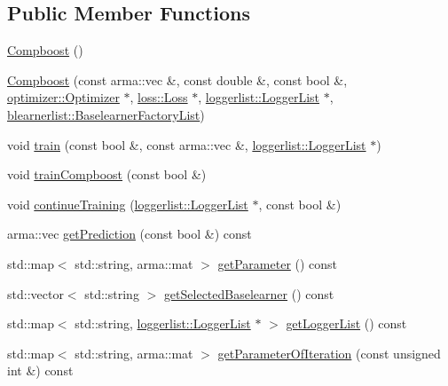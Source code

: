 \subsection*{Public Member Functions}
\begin{DoxyCompactItemize}
\item 
\hyperlink{classcboost_1_1_compboost_a5117b7b8cf0a424e736f6833bc5c3a68}{Compboost} ()
\item 
\hyperlink{classcboost_1_1_compboost_a24b98d64e9aac2a7a8ec4e64a49a1f7c}{Compboost} (const arma\+::vec \&, const double \&, const bool \&, \hyperlink{classoptimizer_1_1_optimizer}{optimizer\+::\+Optimizer} $\ast$, \hyperlink{classloss_1_1_loss}{loss\+::\+Loss} $\ast$, \hyperlink{classloggerlist_1_1_logger_list}{loggerlist\+::\+Logger\+List} $\ast$, \hyperlink{classblearnerlist_1_1_baselearner_factory_list}{blearnerlist\+::\+Baselearner\+Factory\+List})
\item 
void \hyperlink{classcboost_1_1_compboost_aa898572eb2c83e0b95c12788a859333b}{train} (const bool \&, const arma\+::vec \&, \hyperlink{classloggerlist_1_1_logger_list}{loggerlist\+::\+Logger\+List} $\ast$)
\item 
void \hyperlink{classcboost_1_1_compboost_a52ea04dec53c68865fdc4a79461d17cb}{train\+Compboost} (const bool \&)
\item 
void \hyperlink{classcboost_1_1_compboost_a191aa22dbfcc3d2e878ef75c0b196d07}{continue\+Training} (\hyperlink{classloggerlist_1_1_logger_list}{loggerlist\+::\+Logger\+List} $\ast$, const bool \&)
\item 
arma\+::vec \hyperlink{classcboost_1_1_compboost_a741143ae1cb41c54346e19f8bec3454d}{get\+Prediction} (const bool \&) const
\item 
std\+::map$<$ std\+::string, arma\+::mat $>$ \hyperlink{classcboost_1_1_compboost_a7b90eaa8107f91806b09ceedf8581537}{get\+Parameter} () const
\item 
std\+::vector$<$ std\+::string $>$ \hyperlink{classcboost_1_1_compboost_ac66d4490e6539832d4d304a86db746dc}{get\+Selected\+Baselearner} () const
\item 
std\+::map$<$ std\+::string, \hyperlink{classloggerlist_1_1_logger_list}{loggerlist\+::\+Logger\+List} $\ast$ $>$ \hyperlink{classcboost_1_1_compboost_a0376256bdfde1a50b420ad7412f4b4dd}{get\+Logger\+List} () const
\item 
std\+::map$<$ std\+::string, arma\+::mat $>$ \hyperlink{classcboost_1_1_compboost_a97b02aa81981e08658d896ff9798b5d0}{get\+Parameter\+Of\+Iteration} (const unsigned int \&) const
\item 

\end{DoxyCompactItemize}
